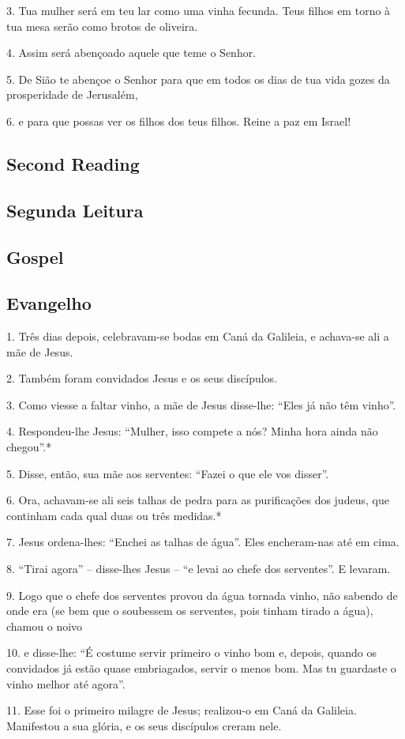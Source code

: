 \documentclass[10pt,a5]{article}
\newcommand \subsect[2] {\subsection*{#1} \switchcolumn \subsection*{#2} \switchcolumn*}
\begin{document}
\begin{paracol}{2}
3.
Tua mulher será em teu lar como uma vinha fecunda. Teus filhos em torno à tua mesa serão como brotos de oliveira.

4.
Assim será abençoado aquele que teme o Senhor.

5.
De Sião te abençoe o Senhor para que em todos os dias de tua vida gozes da prosperidade de Jerusalém,

6.
e para que possas ver os filhos dos teus filhos. Reine a paz em Israel!


 \switchcolumn*

 \subsect{Second Reading}{Segunda Leitura}



 \switchcolumn



 \switchcolumn*

 \subsect{Gospel}{Evangelho}



 \switchcolumn

 1.
Três dias depois, celebravam-se bodas em Caná da Galileia, e achava-se ali a mãe de Jesus.

2.
Também foram convidados Jesus e os seus discípulos.

3.
Como viesse a faltar vinho, a mãe de Jesus disse-lhe: “Eles já não têm vinho”.

4.
Respondeu-lhe Jesus: “Mulher, isso compete a nós? Minha hora ainda não chegou”.*

5.
Disse, então, sua mãe aos serventes: “Fazei o que ele vos disser”.

6.
Ora, achavam-se ali seis talhas de pedra para as purificações dos judeus, que continham cada qual duas ou três medidas.*

7.
Jesus ordena-lhes: “Enchei as talhas de água”. Eles encheram-nas até em cima.

8.
“Tirai agora” – disse-lhes Jesus – “e levai ao chefe dos serventes”. E levaram.

9.
Logo que o chefe dos serventes provou da água tornada vinho, não sabendo de onde era (se bem que o soubessem os serventes, pois tinham tirado a água), chamou o noivo

10.
e disse-lhe: “É costume servir primeiro o vinho bom e, depois, quando os convidados já estão quase embriagados, servir o menos bom. Mas tu guardaste o vinho me­lhor até agora”.

11.
Esse foi o primeiro milagre de Jesus; realizou-o em Caná da Galileia. Manifestou a sua glória, e os seus discípulos creram nele.



 \switchcolumn*

\end{paracol}
\end{document}
